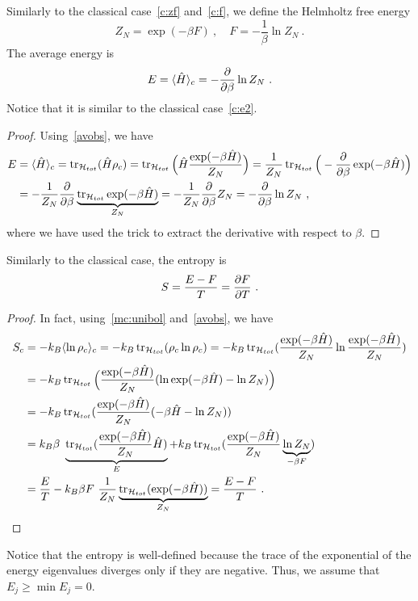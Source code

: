     Similarly to the classical case~\eqref{c:zf} and~\eqref{c:f}, we define the Helmholtz free energy
    \begin{equation*}
        Z_N = \exp(- \beta F) ~, \quad F = - \frac{1}{\beta} \ln Z_N ~.
    \end{equation*}
    The average energy is 
    \begin{equation*}
        E = \langle\hat H\rangle_c = - \frac{\partial}{\partial\beta} \ln Z_N ~.
    \end{equation*}
    Notice that it is similar to the classical case~\eqref{c:e2}.
    \begin{proof}
        Using~\eqref{avobs}, we have
        \begin{equation*}
        \begin{aligned}
            E & = \langle\hat H\rangle_c  = \operatorname{tr}_{\mathcal H_{tot}} (\hat H \rho_c) = \operatorname{tr}_{\mathcal H_{tot}} \Big ( \hat H \frac{\exp(- \beta \hat H)}{Z_N} \Big ) = \frac{1}{Z_N} \operatorname{tr}_{\mathcal H_{tot}} \Big (- \frac{\partial}{\partial\beta} \exp(- \beta \hat H) \Big) \\ & = - \frac{1}{Z_N} \frac{\partial}{\partial\beta} \underbrace{\operatorname{tr}_{\mathcal H_{tot}} \exp(- \beta \hat H)}_{Z_N} = - \frac{1}{Z_N} \frac{\partial}{\partial\beta} Z_N = - \frac{\partial}{\partial\beta} \ln Z_N ~,
        \end{aligned}
        \end{equation*}
        where we have used the trick to extract the derivative with respect to $\beta$.
    \end{proof}

    Similarly to the classical case, the entropy is 
    \begin{equation*}
        S = \frac{E - F}{T} = \frac{\partial F}{\partial T} ~.
    \end{equation*}
    \begin{proof}
        In fact, using~\eqref{mc:unibol} and~\eqref{avobs}, we have
        \begin{equation*}
        \begin{aligned}
            S_c & = - k_B \langle\ln \rho_c\rangle_c = - k_B \operatorname{tr}_{\mathcal H_{tot}} (\rho_c \ln \rho_c) = - k_B \operatorname{tr}_{\mathcal H_{tot}} (\frac{\exp(- \beta \hat H)}{Z_N} \ln \frac{\exp(- \beta \hat H)}{Z_N}) \\ & = - k_B \operatorname{tr}_{\mathcal H_{tot}} \Big (\frac{\exp(- \beta \hat H)}{Z_N} (\ln \exp(- \beta \hat H) - \ln Z_N) \Big ) \\ & = - k_B \operatorname{tr}_{\mathcal H_{tot}} (\frac{\exp(- \beta \hat H)}{Z_N} (- \beta \hat H - \ln Z_N)) \\ & = k_B \beta ~ \underbrace{\operatorname{tr}_{\mathcal H_{tot}} (\frac{\exp(- \beta \hat H)}{Z_N} \hat H )}_E + k_B \operatorname{tr}_{\mathcal H_{tot}} (\frac{\exp(- \beta \hat H)}{Z_N} \underbrace{\ln Z_N}_{- \beta F} ) \\ & = \frac{E}{T} - k_B \beta F ~ \frac{1}{Z_N} \underbrace{\operatorname{tr}_{\mathcal H_{tot}} (\exp(- \beta \hat H))}_{Z_N} = \frac{E-F}{T} ~.
        \end{aligned}
        \end{equation*}
    \end{proof}
    Notice that the entropy is well-defined because the trace of the exponential of the energy eigenvalues diverges only if they are negative. Thus, we assume that $E_j \geq \min E_j = 0$.

